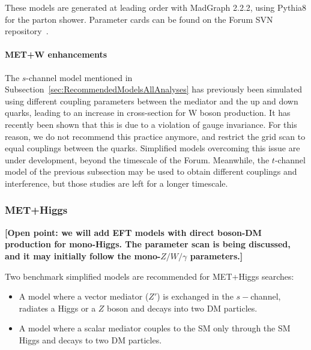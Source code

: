 \documentclass[debug,notitlepage]{dmfm}
\begin{document}
These models are generated at leading
order with MadGraph 2.2.2, using Pythia8 for the parton shower.
Parameter cards can be found on the Forum SVN repository~\cite{ForumSVN_EWEFTD7}.

\paragraph{MET+W enhancements} The $s$-channel model mentioned in
Subsection~\ref{sec:RecommendedModelsAllAnalyses} has previously been
simulated using different coupling parameters between the mediator and
the up and down quarks, leading to an increase in cross-section for W
boson production. It has recently been shown \cite{Bell:2015sza} that
this is due to a violation of gauge invariance. For this reason, we do
not recommend this practice anymore, and restrict the grid scan to
equal couplings between the quarks. Simplified models overcoming this
issue are under development, beyond the timescale of the Forum.
Meanwhile, the $t$-channel model of the previous subsection may be
used to obtain different couplings and interference, but those studies
are left for a longer timescale.

\subsubsection{MET+Higgs} 

\textbf{[Open point: we will add EFT models with direct boson-DM production 
for mono-Higgs. The parameter scan is being discussed, and 
it may initially follow the mono-$Z/W/\gamma$ parameters.]}

Two benchmark simplified models \cite{Carpenter:2013xra} 
are recommended for MET+Higgs searches:
\begin{itemize}
 \item A model where a vector mediator ($Z'$) is exchanged in the $s-$channel, 
 radiates a Higgs or a $Z$ boson and decays into two DM particles. 
 \item A model where a scalar mediator couples to the SM only 
 through the SM Higgs and decays to two DM particles. 
\end{itemize}
\end{document}
